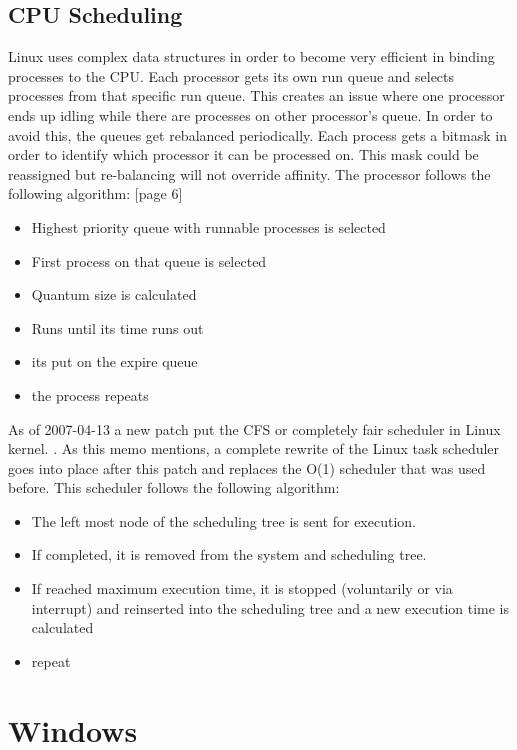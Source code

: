 \documentclass[journal,10pt,onecolumn,compsoc,letterpaper,draftclsnofoot,table,xcdraw]{IEEEtran} \usepackage[margin=0.75in]{geometry}
\begin{document}
\subsection{CPU Scheduling}
\noindent Linux uses complex data structures in order to become very efficient in binding processes to the CPU. Each processor gets its own run queue and selects processes from that specific run queue. This creates an issue where one processor ends up idling while there are processes on other processor's queue. In order to avoid this, the queues get rebalanced periodically. Each process gets a bitmask in order to identify which processor it can be processed on. This mask could be reassigned but re-balancing will not override affinity. The processor follows the following algorithm: \cite{cscedu}[page 6]
\begin{itemize}
\item Highest priority queue with runnable processes is selected
\item First process on that queue is selected
\item Quantum size is calculated
\item Runs until its time runs out
\item its put on the expire queue
\item the process repeats
\end{itemize}
\noindent As of 2007-04-13 a new patch put the CFS or completely fair scheduler in Linux kernel. \cite{cfsmemo}. As this memo mentions, a complete rewrite of the Linux task scheduler goes into place after this patch and replaces the O(1) scheduler that was used before. This scheduler follows the following algorithm: \cite{cfshw}
\begin{itemize}
\item The left most node of the scheduling tree is sent for execution.
\item If completed, it is removed from the system and scheduling tree.
\item If reached maximum execution time, it is stopped (voluntarily or via interrupt) and reinserted into the scheduling tree and a new execution time is calculated
\item repeat
\end{itemize}
\section{Windows}
\end{document}

